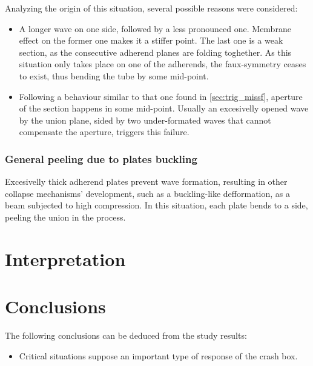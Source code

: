Analyzing the origin of this situation, several possible reasons were considered:
\begin{itemize}
\item A longer wave on one side, followed by a less pronounced one. Membrane effect on the former one makes it a stiffer point. The last one is a weak section, as the consecutive adherend planes are folding toghether. As this situation only takes place on one of the adherends, the faux-symmetry ceases to exist, thus bending the tube by some mid-point.
\item Following a behaviour similar to that one found in \ref{sec:trig_missf}, aperture of the section happens in some mid-point. Usually an excesivelly opened wave by the union plane, sided by two under-formated waves that cannot compensate the aperture, triggers this failure.
\end{itemize}

\subsubsection{General peeling due to plates buckling}

Excesivelly thick adherend plates prevent wave formation, resulting in other collapse mechanisms' development, such as a buckling-like defformation, as a beam subjected to high compression. In this situation, each plate bends to a side, peeling the union in the process.


\section{Interpretation}  %

\section{Conclusions}

The following conclusions can be deduced from the study results:
\begin{itemize}
\item Critical situations suppose an important type of response of the crash box.
\end{itemize}